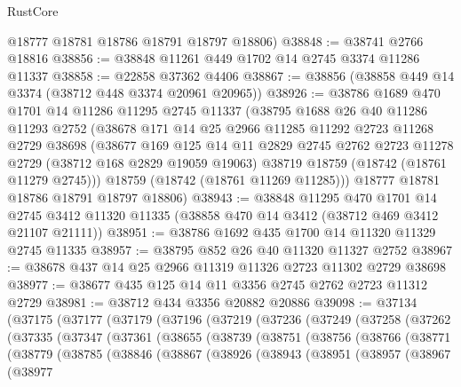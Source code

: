 \begin{lexlean}{RustCore}
\begin{coremodule}
      @18777
      @18781
      @18786
      @18791
      @18797
      @18806)
@38848 := @38741 @2766 @18816
@38856 := @38848 @11261 @449 @1702 @14 @2745 @3374 @11286 @11337
@38858 := @22858 @37362 @4406
@38867 := @38856 (@38858 @449 @14 @3374 (@38712 @448 @3374 @20961 @20965))
@38926 := @38786
    @1689
    @470
    @1701
    @14
    @11286
    @11295
    @2745
    @11337
    (@38795
      @1688
      @26
      @40
      @11286
      @11293
      @2752
      (@38678
        @171
        @14
        @25
        @2966
        @11285
        @11292
        @2723
        @11268
        @2729
        @38698
        (@38677
          @169
          @125
          @14
          @11
          @2829
          @2745
          @2762
          @2723
          @11278
          @2729
          (@38712 @168 @2829 @19059 @19063)
          @38719
          @18759
          (@18742 (@18761 @11279 @2745)))
        @18759
        (@18742 (@18761 @11269 @11285)))
      @18777
      @18781
      @18786
      @18791
      @18797
      @18806)
@38943 := @38848
    @11295
    @470
    @1701
    @14
    @2745
    @3412
    @11320
    @11335
    (@38858 @470 @14 @3412 (@38712 @469 @3412 @21107 @21111))
@38951 := @38786 @1692 @435 @1700 @14 @11320 @11329 @2745 @11335
@38957 := @38795 @852 @26 @40 @11320 @11327 @2752
@38967 := @38678 @437 @14 @25 @2966 @11319 @11326 @2723 @11302 @2729 @38698
@38977 := @38677 @435 @125 @14 @11 @3356 @2745 @2762 @2723 @11312 @2729
@38981 := @38712 @434 @3356 @20882 @20886
@39098 := @37134
    (@37175
      (@37177
        (@37179
          (@37196
            (@37219
              (@37236
                (@37249
                  (@37258
                    (@37262
                      (@37335
                        (@37347
                          (@37361
                            (@38655
                              (@38739
                                (@38751
                                  (@38756
                                    (@38766
                                      (@38771
                                        (@38779
                                          (@38785
                                            (@38846
                                              (@38867
                                                (@38926
                                                  (@38943
                                                    (@38951
                                                      (@38957
                                                        (@38967
                                                          (@38977

\end{coremodule}
\end{lexlean}
